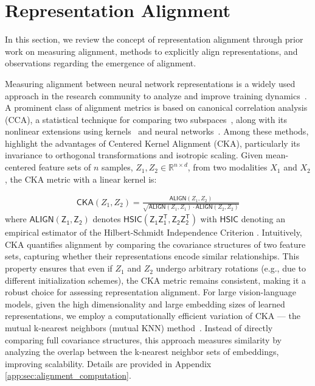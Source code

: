 \section{Representation Alignment}

In this section, we review the concept of representation alignment through prior work on measuring alignment, methods to explicitly align representations, and observations regarding the emergence of alignment.

  Measuring alignment between neural network representations is a widely used approach in the research community to analyze and improve training dynamics~\citep{huh_platonic_2024,klabunde_similarity_2024,kornblith_similarity_2019}. A prominent class of alignment metrics is based on canonical correlation analysis (CCA), a statistical technique for comparing two subspaces~\citep{thompsonCanonicalCorrelationAnalysis2005,golub1995canonical}, along with its nonlinear extensions using kernels~\cite{lai2000kernel,raghu_svcca_2017} and neural networks~\cite{andrew2013deep,wang2015deep,morcos_insights_2018}.  Among these methods, \citet{kornblith_similarity_2019} highlight the advantages of Centered Kernel Alignment (CKA), particularly its invariance to orthogonal transformations and isotropic scaling. Given mean-centered feature sets of \(n\) samples, \(Z_1, Z_2 \in \mathbb{R}^{n \times d}\), from two modalities \(X_1\) and \(X_2\), the CKA metric with a linear kernel is:

\begin{align*}
    \mathsf{CKA}(Z_1, Z_2) = \frac{\mathsf{ALIGN}(Z_1, Z_2)}{\sqrt{\mathsf{ALIGN}(Z_1, Z_1) \cdot \mathsf{ALIGN}(Z_2, Z_2)}}
\end{align*}
where \(\mathsf{ALIGN(Z_1, Z_2)}\) denotes $\mathsf{HSIC(Z_1Z_1^T, Z_2Z_2^T)}$ with $\mathsf{HSIC}$ denoting an empirical estimator of the Hilbert-Schmidt Independence Criterion \cite{gretton2005measuring}. Intuitively, CKA quantifies alignment by comparing the covariance structures of two feature sets, capturing whether their representations encode similar relationships. This property ensures that even if \(Z_1\) and \(Z_2\) undergo arbitrary rotations (e.g., due to different initialization schemes), the CKA metric remains consistent, making it a robust choice for assessing representation alignment. For large vision-language models, given the high dimensionality and large embedding sizes of learned representations, we employ a computationally efficient variation of CKA — the mutual k-nearest neighbors (mutual KNN) method~\cite{huh_platonic_2024}. Instead of directly comparing full covariance structures, this approach measures similarity by analyzing the overlap between the k-nearest neighbor sets of embeddings, improving scalability. Details are provided in Appendix \ref{app:sec:alignment_computation}.




